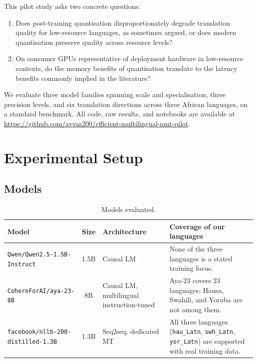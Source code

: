 \documentclass[11pt,a4paper]{article}
\begin{document}
This pilot study asks two concrete questions:

\begin{enumerate}
\item Does post-training quantisation disproportionately degrade
      translation quality for low-resource languages, as sometimes
      argued, or does modern quantisation preserve quality across
      resource levels?
\item On consumer GPUs representative of deployment hardware in
      low-resource contexts, do the memory benefits of quantisation
      translate to the latency benefits commonly implied in the
      literature?
\end{enumerate}

We evaluate three model families spanning scale and specialisation,
three precision levels, and six translation directions across three
African languages, on a standard benchmark. All code, raw results, and
notebooks are available at
\url{https://github.com/avvas200/efficient-multilingual-nmt-pilot}.

\section{Experimental Setup}

\subsection{Models}

\begin{table}[h]
\centering
\small
\begin{tabular}{p{4.2cm}cp{2.4cm}p{5.4cm}}
\toprule
Model & Size & Architecture & Coverage of our languages \\
\midrule
\texttt{Qwen/Qwen2.5-1.5B-}\newline\texttt{Instruct} & 1.5B & Causal LM &
None of the three languages is a stated training focus. \\
\addlinespace
\texttt{CohereForAI/aya-23-8B} & 8B & Causal LM, multilingual
instruction-tuned & Aya-23 covers 23 languages; Hausa, Swahili, and
Yoruba are not among them. \\
\addlinespace
\texttt{facebook/nllb-200-}\newline\texttt{distilled-1.3B} & 1.3B & Seq2seq,
dedicated MT & All three languages (\texttt{hau\_Latn},
\texttt{swh\_Latn}, \texttt{yor\_Latn}) are supported with real
training data. \\
\bottomrule
\end{tabular}
\caption{Models evaluated.}
\end{table}
\end{document}
